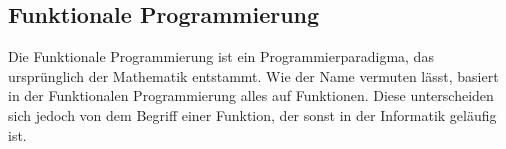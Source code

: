 

\subsection{Funktionale Programmierung}
Die Funktionale Programmierung ist ein Programmierparadigma, das ursprünglich der Mathematik entstammt. Wie der Name vermuten lässt, basiert in der Funktionalen Programmierung alles auf Funktionen. Diese unterscheiden sich jedoch von dem Begriff einer Funktion, der sonst in der Informatik geläufig ist.

